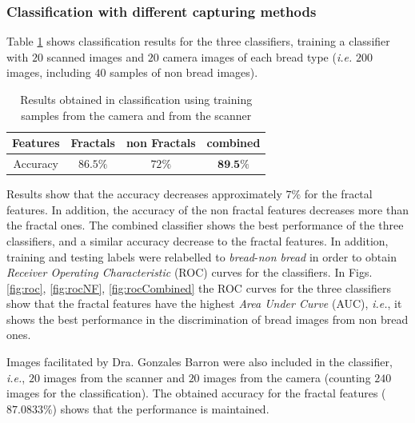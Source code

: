\documentclass[oneside,a4paper,english,links]{amca}
\begin{document}
\subsubsection{Classification with different capturing methods}
Table \ref{table:tableRobustnessTest1} shows classification results for the three classifiers, training a classifier with $20$ scanned images and $20$ camera images of each bread type ({\em i.e.} $200$ images, including $40$ samples of non bread images). 

\begin{table}[ht!b]
\centering
\begin{tabular}{|c|c|c|c|}
    \hline
    Features & Fractals & non Fractals & combined\\
    \hline
    \hline
    Accuracy  & $86.5\%$ & $72\%$ & $\textbf{89.5\%}$\\
    \hline
\end{tabular}
\caption{Results obtained in classification using training samples from the camera and from the scanner}
\label{table:tableRobustnessTest1}
\end{table}

Results show that the accuracy decreases approximately $7\%$ for the fractal features. In addition, the accuracy of the non fractal features decreases more than the fractal ones. The combined classifier shows the best performance of the three classifiers, and a similar accuracy decrease to the fractal features. In addition, training and testing labels were relabelled to {\em bread}-{\em non bread} in order to obtain {\em Receiver Operating Characteristic} (ROC) curves for the classifiers. In Figs. \ref{fig:roc}, \ref{fig:rocNF}, \ref{fig:rocCombined} the ROC curves for the three classifiers show that the fractal features have the highest {\em Area Under Curve} (AUC), {\em i.e.}, it shows the best performance in the discrimination of bread images from non bread ones.

Images facilitated by Dra. Gonzales Barron were also included in the classifier, {\em i.e.}, $20$ images from the scanner and $20$ images from the camera (counting $240$ images for the classification). The obtained accuracy for the fractal features ($87.0833\%$) shows that the performance is maintained.
\end{document}
